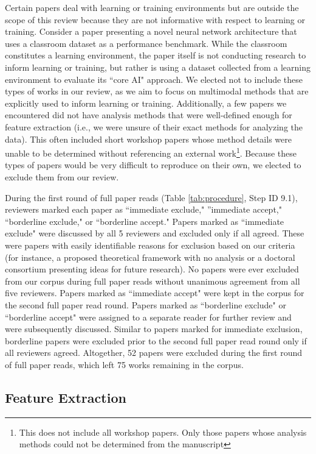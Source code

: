 \documentclass[manuscript,screen,review]{acmart}
\begin{document}
Certain papers deal with learning or training environments but are outside the scope of this review because they are not informative with respect to learning or training. Consider a paper presenting a novel neural network architecture that uses a classroom dataset as a performance benchmark. While the classroom constitutes a learning environment, the paper itself is not conducting research to inform learning or training, but rather is using a dataset collected from a learning environment to evaluate its ``core AI" approach. We elected not to include these types of works in our review, as we aim to focus on multimodal methods that are explicitly used to inform learning or training. Additionally, a few papers we encountered did not have analysis methods that were well-defined enough for feature extraction (i.e., we were unsure of their exact methods for analyzing the data). This often included short workshop papers whose method details were unable to be determined without referencing an external work\footnote{This does not include all workshop papers. Only those papers whose analysis methods could not be determined from the manuscript}. Because these types of papers would be very difficult to reproduce on their own, we elected to exclude them from our review.

During the first round of full paper reads (Table \ref{tab:procedure}, Step ID 9.1), reviewers marked each paper as ``immediate exclude," ''immediate accept," ``borderline exclude," or ``borderline accept." Papers marked as ``immediate exclude" were discussed by all 5 reviewers and excluded only if all agreed. These were papers with easily identifiable reasons for exclusion based on our criteria (for instance, a proposed theoretical framework with no analysis or a doctoral consortium presenting ideas for future research). No papers were ever excluded from our corpus during full paper reads without unanimous agreement from all five reviewers. Papers marked as ``immediate accept" were kept in the corpus for the second full paper read round. Papers marked as ``borderline exclude" or ``borderline accept" were assigned to a separate reader for further review and were subsequently discussed. Similar to papers marked for immediate exclusion, borderline papers were excluded prior to the second full paper read round only if all reviewers agreed. Altogether, 52 papers were excluded during the first round of full paper reads, which left 75 works remaining in the corpus. 

\subsection{Feature Extraction} \label{subsec:feature_extraction}
\end{document}
